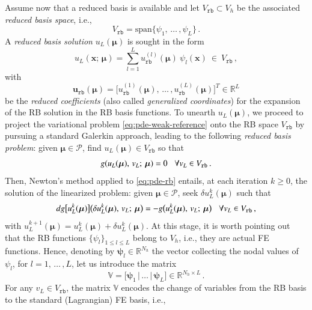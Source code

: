 \documentclass{elsarticle}
\numberwithin{equation}{section}
\theoremstyle{theorem}
\theoremstyle{definition}
\theoremstyle{remark}
\theoremstyle{proposition}
\numberwithin{figure}{section}
\newcommand{\bg}[1]{\boldsymbol{#1}}
\begin{document}
		Assume now that a reduced basis is available and let $V_{\texttt{rb}} \subset V_h$ be the associated \emph{reduced basis space}, i.e.,
		\begin{equation*}
			V_{\texttt{rb}} = \text{span} \big\lbrace \psi_1, \, \ldots \, , \psi_L \big\rbrace \, .
		\end{equation*} 
		A \emph{reduced basis solution} $u_{L}(\bg{\mu})$ is sought in the form
		\begin{equation*}
			\label{eq:rb-solution}
			u_{L}(\bg{x}; \, \bg{\mu}) = \sum_{l = 1}^L u_{\texttt{rb}}^{(l)}(\bg{\mu}) ~ \psi_l(\bg{x}) ~ \in ~ V_{\texttt{rb}} \, ,
		\end{equation*}
		with \[ \mathbf{u}_{\texttt{rb}}(\bg{\mu}) = \big[ u_{\texttt{rb}}^{(1)}(\bg{\mu}), \, \ldots \, , u_{\texttt{rb}}^{(L)}(\bg{\mu}) \big]^T \in \mathbb{R}^L \] be the \emph{reduced coefficients} (also called \emph{generalized coordinates}) for the expansion of the RB solution in the RB basis functions. To unearth $u_L(\bg{\mu})$, we proceed to project the variational problem \eqref{eq:pde-weak-reference} onto the RB space $V_{\texttt{rb}}$ by pursuing a standard Galerkin approach, leading to the following \emph{reduced basis problem}: given $\bg{\mu} \in \mathcal{P}$, find $u_L(\bg{\mu}) \in V_{\texttt{rb}}$ so that
		\begin{equation}
			\label{eq:pde-rb}
			g(u_L(\bg{\mu}), \, v_L; \, \bg{\mu}) = 0 \hspace*{0.3cm} \forall v_L \in V_{\texttt{rb}} \, .
		\end{equation}
		Then, Newton's method applied to \eqref{eq:pde-rb} entails, at each iteration $k \geq 0$, the solution of the linearized problem: given $\bg{\mu} \in \mathcal{P}$, seek $\delta u_{L}^k(\bg{\mu})$ such that
		\begin{equation*}
			\label{eq:pde-rb-newton}
			dg \big[ u_{L}^k(\bg{\mu}) \big] \big( \delta u_{L}^k(\bg{\mu}), \, v_{L}; \, \bg{\mu} \big) = - g \big( u_{L}^k(\bg{\mu}), \, v_{L}; \, \bg{\mu} \big) \hspace*{0.3cm} \forall v_{L} \in V_{\texttt{rb}} \, ,
		\end{equation*}
		with $u_{L}^{k+1}(\bg{\mu}) = u_{L}^k(\bg{\mu}) + \delta u_{L}^k(\bg{\mu})$. At this stage, it is worth pointing out that the RB functions $\big\lbrace \psi_l \big\rbrace_{1 \leq l \leq L}$ belong to $V_h$, i.e., they are actual FE functions. Hence, denoting by $\bg{\psi}_l \in \mathbb{R}^{N_h}$ the vector collecting the nodal values of $\psi_l$, for $l = 1, \, \ldots \, , L$, let us introduce the matrix \[ \mathbb{V} = \big[ \bg{\psi}_1 \, \big| \, \ldots \, \big| \, \bg{\psi}_L \big] \in \mathbb{R}^{{N_h} \times L} \, .\] For any $v_{L} \in V_{\texttt{rb}}$, the matrix $\mathbb{V}$ encodes the change of variables from the RB basis to the standard (Lagrangian) FE basis, i.e.,
\end{document}
